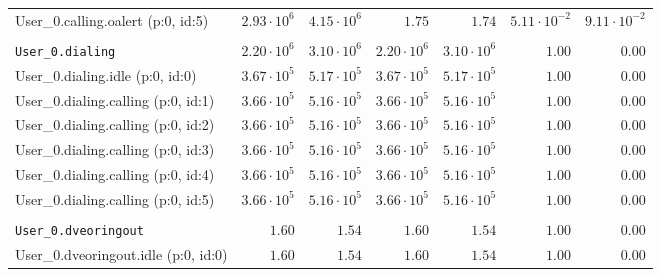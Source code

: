 \begin{table}[htbp]
{\begin{tabular}{lrrrrrr}
\hspace{3mm}User\_0.calling.oalert (p:0, id:5)       &  $2.93 \cdot 10^{6}$ &  $4.15 \cdot 10^{6}$ &               $1.75$ &               $1.74$ & $5.11 \cdot 10^{-2}$ & $9.11 \cdot 10^{-2}$ \\
\\[-8pt]\texttt{User\_0.dialing}                     &  $2.20 \cdot 10^{6}$ &  $3.10 \cdot 10^{6}$ &  $2.20 \cdot 10^{6}$ &  $3.10 \cdot 10^{6}$ &               $1.00$ &               $0.00$ \\
\hspace{3mm}User\_0.dialing.idle (p:0, id:0)         &  $3.67 \cdot 10^{5}$ &  $5.17 \cdot 10^{5}$ &  $3.67 \cdot 10^{5}$ &  $5.17 \cdot 10^{5}$ &               $1.00$ &               $0.00$ \\
\hspace{3mm}User\_0.dialing.calling (p:0, id:1)      &  $3.66 \cdot 10^{5}$ &  $5.16 \cdot 10^{5}$ &  $3.66 \cdot 10^{5}$ &  $5.16 \cdot 10^{5}$ &               $1.00$ &               $0.00$ \\
\hspace{3mm}User\_0.dialing.calling (p:0, id:2)      &  $3.66 \cdot 10^{5}$ &  $5.16 \cdot 10^{5}$ &  $3.66 \cdot 10^{5}$ &  $5.16 \cdot 10^{5}$ &               $1.00$ &               $0.00$ \\
\hspace{3mm}User\_0.dialing.calling (p:0, id:3)      &  $3.66 \cdot 10^{5}$ &  $5.16 \cdot 10^{5}$ &  $3.66 \cdot 10^{5}$ &  $5.16 \cdot 10^{5}$ &               $1.00$ &               $0.00$ \\
\hspace{3mm}User\_0.dialing.calling (p:0, id:4)      &  $3.66 \cdot 10^{5}$ &  $5.16 \cdot 10^{5}$ &  $3.66 \cdot 10^{5}$ &  $5.16 \cdot 10^{5}$ &               $1.00$ &               $0.00$ \\
\hspace{3mm}User\_0.dialing.calling (p:0, id:5)      &  $3.66 \cdot 10^{5}$ &  $5.16 \cdot 10^{5}$ &  $3.66 \cdot 10^{5}$ &  $5.16 \cdot 10^{5}$ &               $1.00$ &               $0.00$ \\
\\[-8pt]\texttt{User\_0.dveoringout}                 &               $1.60$ &               $1.54$ &               $1.60$ &               $1.54$ &               $1.00$ &               $0.00$ \\
\hspace{3mm}User\_0.dveoringout.idle (p:0, id:0)     &               $1.60$ &               $1.54$ &               $1.60$ &               $1.54$ &               $1.00$ &               $0.00$ \\

\end{tabular}}
\end{table}
